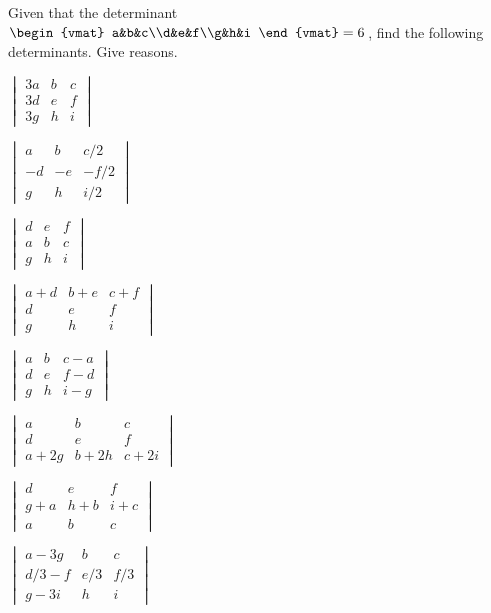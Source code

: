\begin{exercise}  
Given that the determinant
\(\begin{vmat} a&b&c\\d&e&f\\g&h&i \end{vmat}=6\)\,,
find the following determinants.  Give reasons.
\begin{Parts}
\item \(\begin{vmatrix} 3a&b&c\\3d&e&f\\3g&h&i \end{vmatrix}\)

\item \(\begin{vmatrix} a&b&c/2\\-d&-e&-f/2\\g&h&i/2 \end{vmatrix}\)

\item \(\begin{vmatrix} d&e&f\\a&b&c\\g&h&i \end{vmatrix}\)

\item \(\begin{vmatrix} a+d&b+e&c+f\\d&e&f\\g&h&i \end{vmatrix}\)

\item \(\begin{vmatrix} a&b&c-a\\d&e&f-d\\g&h&i-g \end{vmatrix}\)

\item \(\begin{vmatrix} a&b&c\\d&e&f\\a+2g&b+2h&c+2i \end{vmatrix}\)

\begin{OmitV1}
\item \(\begin{vmatrix} d&e&f\\g+a&h+b&i+c\\a&b&c \end{vmatrix}\)

\item \(\begin{vmatrix} a-3g&b&c\\d/3-f&e/3&f/3\\g-3i&h&i \end{vmatrix}\)
\end{OmitV1}

\end{Parts}
\end{exercise}





